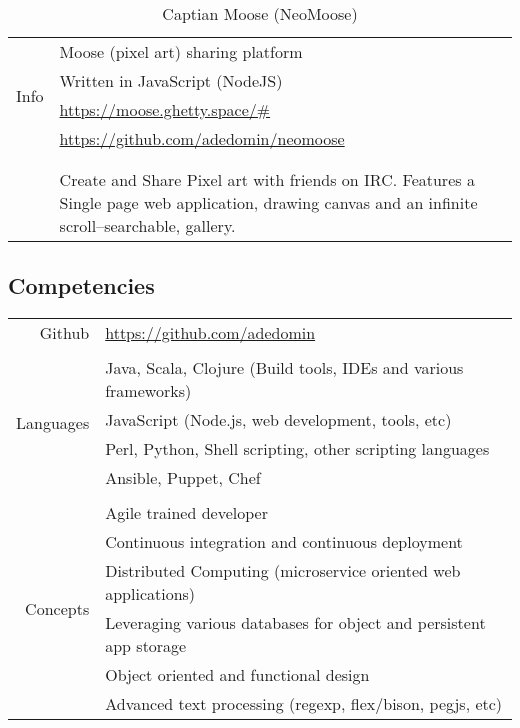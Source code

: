 \documentclass[letterpaper,]{article}
\begin{document}
\begin{table}[!ht]
\centering
    \caption{Captian Moose (NeoMoose)}
    \begin{tabularx}{\textwidth}{r|X}
        \multirow{4}{*}{Info} & Moose (pixel art) sharing platform \\
                              & Written in JavaScript (NodeJS) \\
                              & \href{https://moose.ghetty.space/\#}{https://moose.ghetty.space/\#} \\
                              & \href{https://github.com/adedomin/neomoose}{https://github.com/adedomin/neomoose} \\
        & \\
        \begin{tabular}{@{}l@{}}
            Description \\
        \end{tabular}
        & Create and Share Pixel art with friends on IRC. 
        Features a Single page web application, drawing canvas and an infinite scroll--searchable, gallery.
    \end{tabularx}
\end{table}

\subsection{Competencies}\label{competencies}

\begin{center}
\begin{tabular}{r|l}
    Github                     & \href{https://github.com/adedomin}{https://github.com/adedomin} \\
    \\
    \multirow{4}{*}{Languages} & Java, Scala, Clojure (Build tools, IDEs and various frameworks) \\
                               & JavaScript (Node.js, web development, tools, etc) \\
                               & Perl, Python, Shell scripting, other scripting languages \\
                               & Ansible, Puppet, Chef \\
    \\
    \multirow{6}{*}{Concepts} & Agile trained developer \\
                              & Continuous integration and continuous deployment \\
                              & Distributed Computing (microservice oriented web applications) \\
                              & Leveraging various databases for object and persistent app storage \\
                              & Object oriented and functional design \\
                              & Advanced text processing (regexp, flex/bison, pegjs, etc) \\
\end{tabular}
\end{center}
\end{document}
